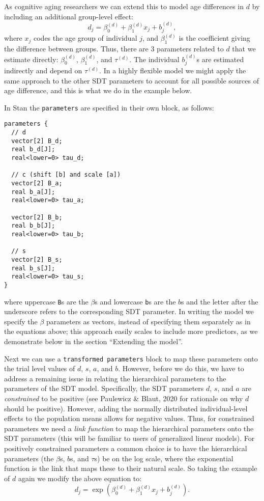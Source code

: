 \documentclass[
  english,
  ,man,floatsintext]{apa6}
\begin{document}
As cognitive aging researchers we can extend this to model age differences in \(d\) by including an additional group-level effect:
\[
d_{j} = \beta_{0}^{(d)} + \beta_{1}^{(d)}x_j + b^{(d)}_{j},
\]
where \(x_j\) codes the age group of individual \(j\), and \(\beta_{1}^{(d)}\) is the coefficient giving the difference between groups. Thus, there are 3 parameters related to \(d\) that we estimate directly: \(\beta_{0}^{(d)}\), \(\beta_{1}^{(d)}\), and \(\tau^{(d)}\). The individual \(b^{(d)}_{j}\)s are estimated indirectly and depend on \(\tau^{(d)}\). In a highly flexible model we might apply the same approach to the other SDT parameters to account for all possible sources of age difference, and this is what we do in the example below.

In Stan the \texttt{parameters} are specified in their own block, as follows:

\begin{verbatim}
parameters {
  // d
  vector[2] B_d;
  real b_d[J];
  real<lower=0> tau_d;
  
  // c (shift [b] and scale [a])
  vector[2] B_a;
  real b_a[J];
  real<lower=0> tau_a;
  
  vector[2] B_b;
  real b_b[J];
  real<lower=0> tau_b;

  // s
  vector[2] B_s;
  real b_s[J];
  real<lower=0> tau_s;
}
\end{verbatim}

where uppercase \texttt{B}s are the \(\beta\)s and lowercase \texttt{b}s are the \(b\)s and the letter after the underscore refers to the corresponding SDT parameter. In writing the model we specify the \(\beta\) parameters as vectors, instead of specifying them separately as in the equations above; this approach easily scales to include more predictors, as we demonstrate below in the section \enquote{Extending the model}.

Next we can use a \texttt{transformed\ parameters} block to map these parameters onto the trial level values of \(d\), \(s\), \(a\), and \(b\). However, before we do this, we have to address a remaining issue in relating the hierarchical parameters to the parameters of the SDT model. Specifically, the SDT parameters \(d\), \(s\), and \(a\) are \emph{constrained} to be positive (see Paulewicz \& Blaut, 2020 for rationale on why \(d\) should be positive). However, adding the normally distributed individual-level effects to the population means allows for negative values. Thus, for constrained parameters we need a \emph{link function} to map the hierarchical parameters onto the SDT parameters (this will be familiar to users of generalized linear models). For positively constrained parameters a common choice is to have the hierarchical parameters (the \(\beta\)s, \(b\)s, and \(\tau\)s) be on the log scale, where the exponential function is the link that maps these to their natural scale. So taking the example of \(d\) again we modify the above equation to:
\[
d_{j} = \exp\left(\beta_{0}^{(d)} + \beta_{1}^{(d)}x_j + b^{(d)}_{j}\right).
\]
\end{document}
